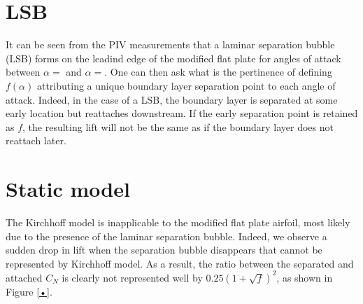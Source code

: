 

\section{LSB}

It can be seen from the PIV measurements that a laminar separation bubble (LSB) forms on the leadind edge of the modified flat plate for angles of attack between $\alpha=$ and $\alpha=$. One can then ask what is the pertinence of defining $f(\alpha)$ attributing a unique boundary layer separation point to each angle of attack. Indeed, in the case of a LSB, the boundary layer is separated at some early location but reattaches downstream. If the early separation point is retained as $f$, the resulting lift will not be the same as if the boundary layer does not reattach later. 


\section{Static model}
The Kirchhoff model is inapplicable to the modified flat plate airfoil, most likely due to the presence of the laminar separation bubble. Indeed, we observe a sudden drop in lift when the separation bubble disappears that cannot be represented by Kirchhoff model. As a result, the ratio between the separated and attached $C_N$ is clearly not represented well by $0.25(1+\sqrt{f})^2$, as shown in Figure \ref{•}.